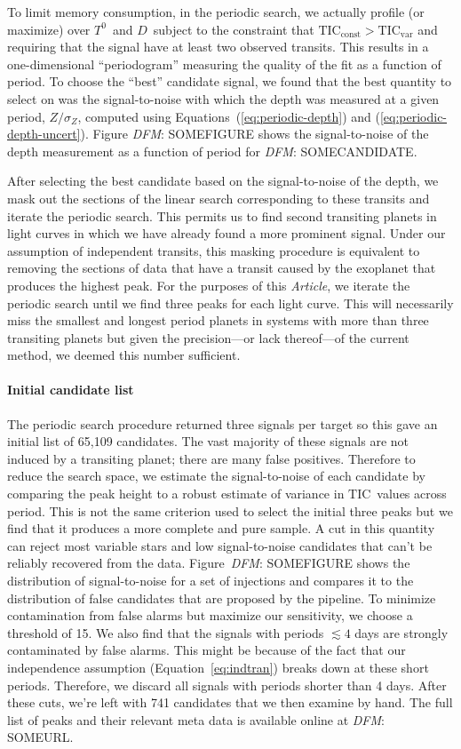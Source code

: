 \documentclass[12pt,preprint]{aastex}
\newcommand{\paper}{\textsl{Article}}
\newcommand{\eqalt}[1]{Equation~\ref{eq:#1}}
\newcommand{\TIC}{{\ensuremath{\mathrm{TIC}}}}
\newcommand{\todo}[3]{{\color{#2}\emph{#1}: #3}}
\newcommand{\dfmtodo}[1]{\todo{DFM}{red}{#1}}
\newcommand{\phase}{{\ensuremath{T^0}}}
\newcommand{\duration}{{\ensuremath{D}}}
\newcommand{\depth}{{\ensuremath{Z}}}
\begin{document}
To limit memory consumption, in the periodic search, we actually profile (or
maximize) over \phase\ and \duration\ subject to the constraint that
$\TIC_\mathrm{const} > \TIC_\mathrm{var}$ and requiring that the signal have
at least two observed transits.
This results in a one-dimensional ``periodogram'' measuring the quality of
the fit as a function of period.
To choose the ``best'' candidate signal, we found that the best quantity to
select on was the signal-to-noise with which the depth was measured at a
given period, $\depth/\sigma_\depth$, computed using
Equations~(\ref{eq:periodic-depth}) and (\ref{eq:periodic-depth-uncert}).
Figure \dfmtodo{SOMEFIGURE} shows the signal-to-noise of the depth measurement as a
function of period for \dfmtodo{SOMECANDIDATE}.

After selecting the best candidate based on the signal-to-noise of the depth,
we mask out the sections of the linear search corresponding to these transits
and iterate the periodic search.
This permits us to find second transiting planets in light curves in which
we have already found a more prominent signal.
Under our assumption of independent transits, this masking procedure is equivalent to removing
the sections of data that have a transit caused by the exoplanet that produces the highest peak.
For the purposes of this \paper, we iterate the periodic search until we find
three peaks for each light curve.
This will necessarily miss the smallest and longest period planets in systems
with more than three transiting planets but given the precision---or lack
thereof---of the current method, we deemed this number sufficient.


\paragraph{Initial candidate list}

The periodic search procedure returned three signals per target so this gave
an initial list of 65,109 candidates.
The vast majority of these signals are not induced by a transiting planet;
there are many false positives.
Therefore to reduce the search space, we estimate the signal-to-noise of each
candidate by comparing the peak height to a robust estimate of variance in
\TIC\ values across period.
This is not the same criterion used to select the initial three peaks but we
find that it produces a more complete and pure sample.
A cut in this quantity can reject most variable stars and low signal-to-noise
candidates that can't be reliably recovered from the data.
Figure~\dfmtodo{SOMEFIGURE} shows the distribution of signal-to-noise for a set of
injections and compares it to the distribution of false candidates that are
proposed by the pipeline.
To minimize contamination from false alarms but maximize our sensitivity, we
choose a threshold of 15.
We also find that the signals with periods $\lesssim 4$ days are strongly
contaminated by false alarms.
This might be because of the fact that our independence assumption
(\eqalt{indtran}) breaks down at these short periods.
Therefore, we discard all signals with periods shorter than 4 days.
After these cuts, we're left with 741 candidates that we then examine by hand.
The full list of peaks and their relevant meta data is available online at
\dfmtodo{SOMEURL}.
\end{document}
